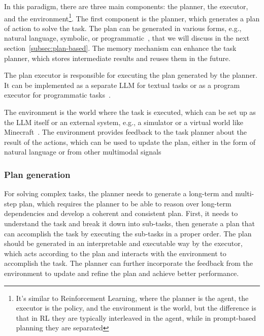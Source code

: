 In this paradigm, there are three main components: the planner, the executor, and the environment\footnote{It's similar to Reinforcement Learning, where the planner is the agent, the executor is the policy, and the environment is the world, but the difference is that in RL they are typically interleaved in the agent, while in prompt-based planning they are separated}.
The first component is the planner, which generates a plan of action to solve the task.
The plan can be generated in various forms, e.g., natural language, symbolic, or programmatic~\cite{gao2022pal, zhou2022least}, that we will discuss in the next section~\ref{subsec:plan-based}.
The memory mechanism can enhance the task planner, which stores intermediate results and reuses them in the future.

The plan executor is responsible for executing the plan generated by the planner.
It can be implemented as a separate LLM for textual tasks or as a program executor for programmatic tasks~\cite{wang2023plan, gao2022pal}.

The environment is the world where the task is executed, which can be set up as the LLM itself or an external system, e.g., a simulator or a virtual world like Minecraft~\cite{yao2023tree, wang2023voyager}.
The environment provides feedback to the task planner about the result of the actions, which can be used to update the plan, either in the form of natural language or from other multimodal signals~\cite{shinn2023reflexion, lu2023multimodal}

\subsubsection{Plan generation}
\label{subsubsec:plan-generation}

For solving complex tasks, the planner needs to generate a long-term and multi-step plan, which requires the planner to be able to reason over long-term dependencies and develop a coherent and consistent plan.
First, it needs to understand the task and break it down into sub-tasks, then generate a plan that can accomplish the task by executing the sub-tasks in a proper order.
The plan should be generated in an interpretable and executable way by the executor, which acts according to the plan and interacts with the environment to accomplish the task.
The planner can further incorporate the feedback from the environment to update and refine the plan and achieve better performance.

